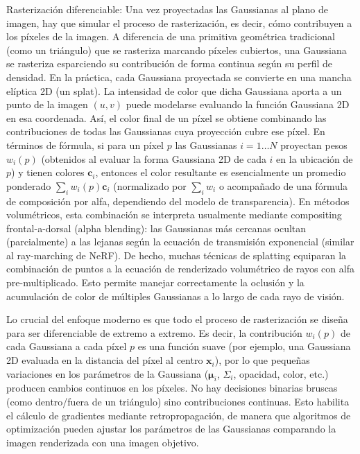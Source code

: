 Rasterización diferenciable: Una vez proyectadas las Gaussianas al plano de imagen, hay que simular el proceso de rasterización, es decir, 
cómo contribuyen a los píxeles de la imagen. A diferencia de una primitiva geométrica tradicional (como un triángulo) que se rasteriza 
marcando píxeles cubiertos, una Gaussiana se rasteriza esparciendo su contribución de forma continua según su perfil de densidad. 
En la práctica, cada Gaussiana proyectada se convierte en una mancha elíptica 2D (un splat). La intensidad de color que dicha Gaussiana 
aporta a un punto de la imagen $(u,v)$ puede modelarse evaluando la función Gaussiana 2D en esa coordenada. Así, el color final de un píxel 
se obtiene combinando las contribuciones de todas las Gaussianas cuya proyección cubre ese píxel. En términos de fórmula, si para un píxel $p$ 
las Gaussianas $i=1\ldots N$ proyectan pesos $w_i(p)$ (obtenidos al evaluar la forma Gaussiana 2D de cada $i$ en la ubicación de $p$) y tienen 
colores $\mathbf{c}_i$, entonces el color resultante es esencialmente un promedio ponderado $\sum_i w_i(p)\mathbf{c}_i$ (normalizado por 
$\sum_i w_i$ o acompañado de una fórmula de composición por alfa, dependiendo del modelo de transparencia). En métodos volumétricos, esta 
combinación se interpreta usualmente mediante compositing frontal-a-dorsal (alpha blending): las Gaussianas más cercanas ocultan (parcialmente) 
a las lejanas según la ecuación de transmisión exponencial (similar al ray-marching de NeRF). De hecho, muchas técnicas de splatting equiparan 
la combinación de puntos a la ecuación de renderizado volumétrico de rayos con alfa pre-multiplicado. Esto permite manejar correctamente la oclusión 
y la acumulación de color de múltiples Gaussianas a lo largo de cada rayo de visión.

Lo crucial del enfoque moderno es que todo el proceso de rasterización se diseña para ser diferenciable de extremo a extremo. Es decir, 
la contribución $w_i(p)$ de cada Gaussiana a cada píxel $p$ es una función suave (por ejemplo, una Gaussiana 2D evaluada en la distancia del 
píxel al centro $\mathbf{x}_i$), por lo que pequeñas variaciones en los parámetros de la Gaussiana ($\boldsymbol{\mu}_i$, $\Sigma_i$, opacidad, 
color, etc.) producen cambios continuos en los píxeles. No hay decisiones binarias bruscas (como dentro/fuera de un triángulo) sino contribuciones 
continuas. Esto habilita el cálculo de gradientes mediante retropropagación, de manera que algoritmos de optimización pueden ajustar los parámetros 
de las Gaussianas comparando la imagen renderizada con una imagen objetivo.


